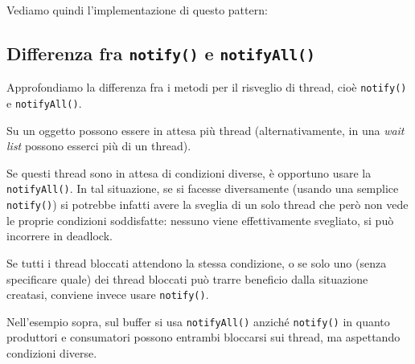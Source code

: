 \documentclass[a4paper,11pt]{article}
\begin{document}
Vediamo quindi l'implementazione di questo pattern:


\subsection{Differenza fra \lstinline|notify()| e \lstinline|notifyAll()|}
Approfondiamo la differenza fra i metodi per il risveglio di thread, cioè \lstinline|notify()| e \lstinline|notifyAll()|.

Su un oggetto possono essere in attesa più thread (alternativamente, in una \textit{wait list} possono esserci più di un thread).

Se questi thread sono in attesa di condizioni diverse, è opportuno usare la \lstinline|notifyAll()|.
In tal situazione, se si facesse diversamente (usando una semplice \lstinline|notify()|) si potrebbe infatti avere la sveglia di un solo thread che però non vede le proprie condizioni soddisfatte: nessuno viene effettivamente svegliato, si può incorrere in deadlock.

Se tutti i thread bloccati attendono la stessa condizione, o se solo uno (senza specificare quale) dei thread bloccati può trarre beneficio dalla situazione creatasi, conviene invece usare \lstinline|notify()|.

Nell'esempio sopra, sul buffer si usa \lstinline|notifyAll()| anziché \lstinline|notify()| in quanto produttori e consumatori possono entrambi bloccarsi sui thread, ma aspettando condizioni diverse.
\end{document}
